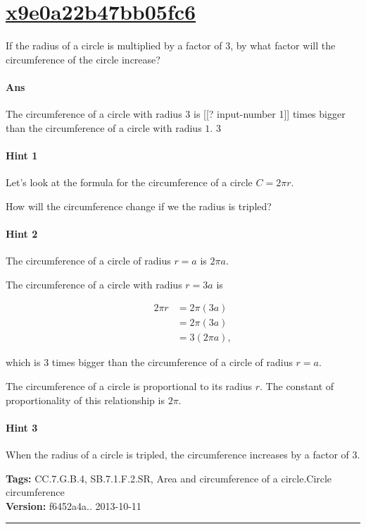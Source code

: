 \documentclass[twocolumn,10pt]{article}
\begin{document}
\section{\href{https://www.khanacademy.org/devadmin/content/items/x9e0a22b47bb05fc6}{x9e0a22b47bb05fc6}}

\noindent
If the radius of a circle is multiplied by a factor of $3$, by what factor will the circumference of the circle increase?

\paragraph{Ans} The circumference of a circle with radius $3$ is [[? input-number 1]] times bigger than the circumference of a circle with radius $1$.  3

\paragraph{Hint 1}Let's look at the formula for the circumference of a circle $C=2\pi r$.  

How will the circumference change if we the radius is tripled?

\paragraph{Hint 2}The circumference of a circle of radius $r=a$ is $2\pi a$.

The circumference of a circle with radius $r=3a$ is 

\begin{align*}
\qquad 
 2\pi r & =2\pi (3a)  \\
  & =2\pi(3a) \\
  &= 3(2\pi a),
\end{align*}   

which is $3$ times bigger than the circumference of a circle of radius $r=a$. 

The circumference of a circle is proportional to its radius $r$. The constant of proportionality of this relationship is $2\pi$.

\paragraph{Hint 3}When the radius of a circle is tripled, the circumference increases by a factor of $3$.



\medskip
\noindent
\textbf{Tags:} {\footnotesize CC.7.G.B.4, SB.7.1.F.2.SR, Area and circumference of a circle.Circle circumference}\\
\textbf{Version:} f6452a4a.. 2013-10-11
\smallskip\hrule
\end{document}
